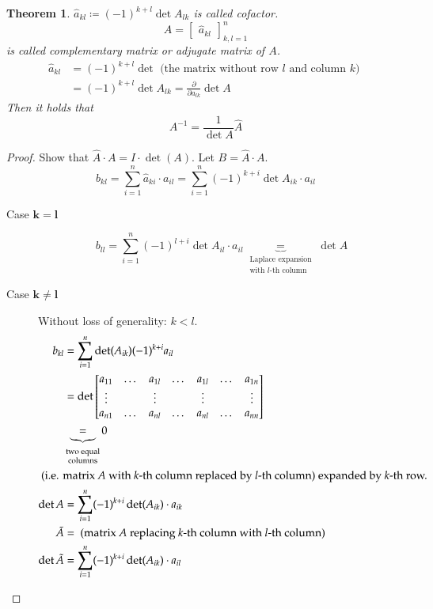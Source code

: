\documentclass{article}
\newtheorem{theorem}{Theorem}  \numberwithin{theorem}{section}
\begin{document}
\begin{theorem} %
  $\hat{a}_{kl} \coloneqq (-1)^{k+l} \det{A_{lk}}$ is called \emph{cofactor}.
  \[ \hat{A} = \begin{bmatrix} \hat{a}_{kl} \end{bmatrix}_{k,l=1}^n \]
  is called \emph{complementary matrix} or \emph{adjugate matrix} of $A$.
  \begin{align*}
    \hat{a}_{kl}
    &= (-1)^{k+l} \det \text{ (the matrix without row $l$ and column $k$) } \\
    &= (-1)^{k+l} \det{A_{lk}} = \frac{\partial}{\partial a_{lk}} \det{A}
  \end{align*}
  Then it holds that
  \[ A^{-1} = \frac{1}{\det{A}} \hat{A} \]
\end{theorem}

\begin{proof}
  Show that $\hat{A} \cdot A = I \cdot \det(A)$.
  Let $B = \hat{A} \cdot A$.
  \[ b_{kl} = \sum_{i=1}^n \hat{a}_{ki} \cdot a_{il} = \sum_{i=1}^n (-1)^{k+i} \det{A_{ik}} \cdot a_{il} \]
  \begin{description}
    \item[Case $\mathbf{k=l}$]
      \[
        b_{ll} = \sum_{i=1}^n (-1)^{l+i} \det{A_{il}} \cdot a_{il}
          \underbrace{=}_{\substack{\text{Laplace expansion} \\ \text{with $l$-th column}}} \det{A}
      \]
    \item[Case $\mathbf{k \neq l}$] Without loss of generality: $k < l$.
      \begin{align*}
        b_{kl} &= \sum_{i=1}^n \det(A_{ik}) (-1)^{k+i} a_{il} \\
               &= \det\begin{bmatrix}
                 a_{11} & \dots & a_{1l} & \dots & a_{1l} & \dots & a_{1n} \\
                 \vdots &       & \vdots &       & \vdots &       & \vdots \\
                 a_{n1} & \dots & a_{nl} & \dots & a_{nl} & \dots & a_{nn}
               \end{bmatrix} \\
               &\underbrace{=}_{\substack{\text{two equal} \\ \text{columns}}} 0 \\
        \intertext{
          (i.e. matrix $A$ with $k$-th column replaced by $l$-th column)
          expanded by $k$-th row.
        }
        \det{A} &= \sum_{i=1}^n (-1)^{k+i} \det(A_{ik}) \cdot a_{ik} \\
        \tilde{A} &= \text{ (matrix $A$ replacing $k$-th column with $l$-th column)} \\
        \det{\tilde{A}} &= \sum_{i=1}^n (-1)^{k+i} \det(A_{ik}) \cdot a_{il}
      \end{align*}
  \end{description}
\end{proof}
\end{document}
